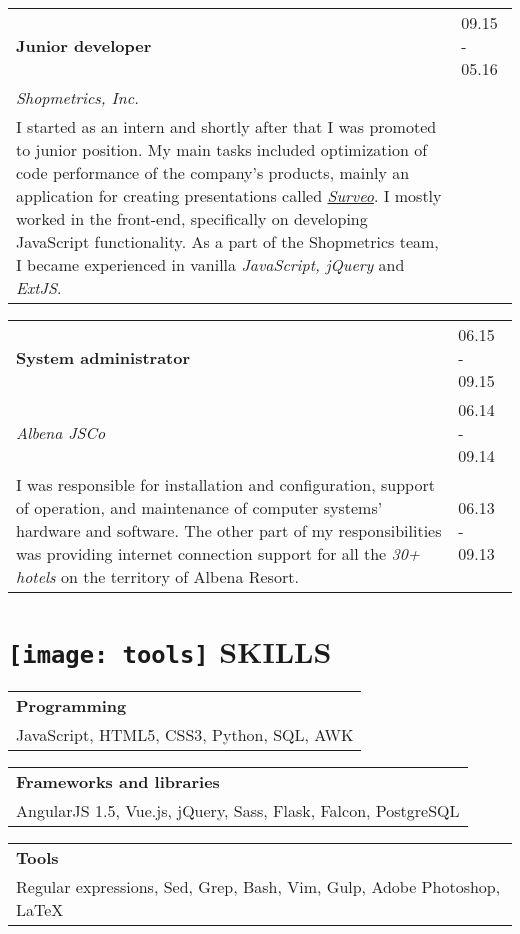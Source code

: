 \documentclass[a4paper,10pt]{article}
\begin{document}
\begin{tabular}{|p{11cm}l}
\textbf{Junior developer} & 09.15 - 05.16 \\
\emph{Shopmetrics, Inc.} & \\
\footnotesize{I started as an intern and shortly after that I was promoted to junior position. My main tasks included optimization of code performance of the company’s products, mainly an application for creating presentations called \href{https://www.surveo.com/index.asp}{\emph{Surveo}}. I mostly worked in the front-end, specifically on developing JavaScript functionality. As a part of the Shopmetrics team, I became experienced in vanilla \emph{JavaScript, jQuery} and \emph{ExtJS}.} & \\ 
\end{tabular}

\begin{tabular}{|p{11cm}l}
\textbf{System administrator} & 06.15 - 09.15 \\
\emph{Albena JSCo} & 06.14 - 09.14 \\
\footnotesize{I was responsible for installation and configuration, support of operation, and maintenance of computer systems’ hardware and software. The other part of my responsibilities was  providing internet connection support for all the \emph{30+ hotels} on the territory of Albena Resort.} & \normalsize{06.13 - 09.13} \\ 
\end{tabular}

\section{\protect\texttt{[image: tools]} SKILLS}

\begin{tabular}{|l}
    \textbf{Programming} \\
    JavaScript, HTML5, CSS3, Python, SQL, AWK \\
\end{tabular}

\begin{tabular}{|l}
    \textbf{Frameworks and libraries} \\
    AngularJS 1.5, Vue.js, jQuery, Sass, Flask, Falcon, PostgreSQL \\
\end{tabular}

\begin{tabular}{|l}
    \textbf{Tools} \\
    Regular expressions, Sed, Grep, Bash, Vim, Gulp, Adobe Photoshop, \LaTeX  \\
\end{tabular}
\end{document}
